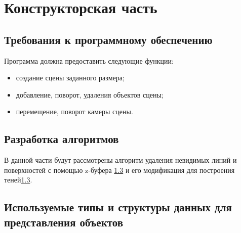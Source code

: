 \chapter{Конструкторская часть}

\section{Требования к программному обеспечению}

Программа должна предоставить следующие функции:
\begin{itemize}
    \item создание сцены заданного размера;
    \item добавление, поворот, удаления объектов сцены;
    \item перемещение, поворот камеры сцены.
\end{itemize}

\section{Разработка алгоритмов}

В данной части будут рассмотрены алгоритм удаления невидимых линий и
поверхностей с помощью z-буфера \ref{} и его модификация для построения теней\ref{}.


\section{Используемые типы и структуры данных для представления объектов}



